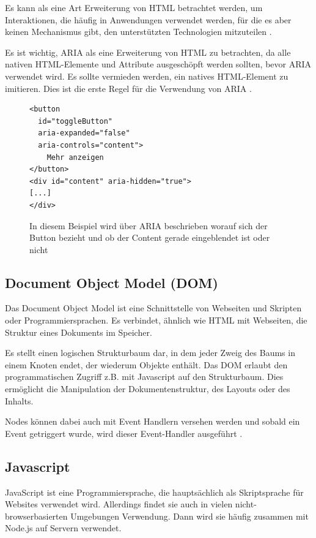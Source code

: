 Es kann als eine Art Erweiterung von HTML betrachtet werden, um Interaktionen, die häufig in Anwendungen verwendet werden, für die es aber keinen Mechanismus gibt, den unterstützten Technologien mitzuteilen \parencite[vgl.][]{mdn_aria_nodate}.

Es ist wichtig, ARIA als eine Erweiterung von HTML zu betrachten, da alle nativen HTML-Elemente und Attribute ausgeschöpft werden sollten, bevor ARIA verwendet wird. Es sollte vermieden werden, ein natives HTML-Element zu imitieren. Dies ist die erste Regel für die Verwendung von ARIA \parencite[vgl.][]{w3c_ariause_nodate}.


\begin{figure}[H]
\begin{verbatim}
<button 
  id="toggleButton" 
  aria-expanded="false" 
  aria-controls="content">
    Mehr anzeigen
</button>
<div id="content" aria-hidden="true">
[...]
</div>
\end{verbatim}
\caption{In diesem Beispiel wird über ARIA beschrieben worauf sich der Button bezieht und ob der Content gerade eingeblendet ist oder nicht}
\end{figure}

\subsection{Document Object Model (DOM)}

Das Document Object Model ist eine Schnittstelle von Webseiten und Skripten oder Programmiersprachen. Es verbindet, ähnlich wie HTML mit Webseiten, die Struktur eines Dokuments im Speicher. 

Es stellt einen logischen Strukturbaum dar, in dem jeder Zweig des Baums in einem Knoten endet, der wiederum Objekte enthält. Das DOM erlaubt den programmatischen Zugriff z.B. mit Javascript auf den Strukturbaum. Dies ermöglicht die Manipulation der Dokumentenstruktur, des Layouts oder des Inhalts.

Nodes können dabei auch mit Event Handlern versehen werden und sobald ein Event getriggert wurde, wird dieser Event-Handler ausgeführt \parencite[vgl.][]{mdn_dom_nodate}.


\subsection{Javascript}

JavaScript ist eine Programmiersprache, die hauptsächlich als Skriptsprache für Websites verwendet wird. Allerdings findet sie auch in vielen nicht-browserbasierten Umgebungen Verwendung. Dann wird sie häufig zusammen mit Node.js auf Servern verwendet. 

